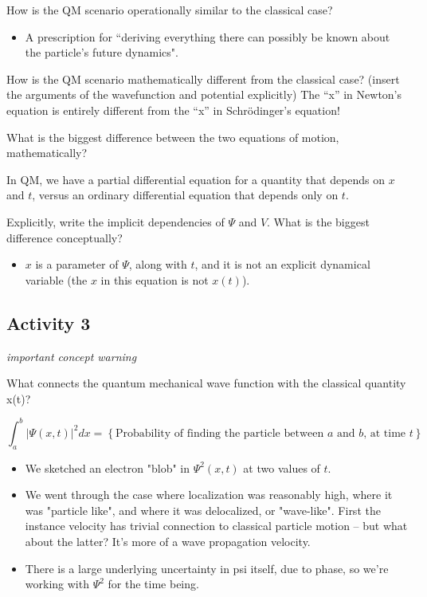 \documentclass{article}
\begin{document}
How is the QM scenario operationally similar to the classical case?

\begin{itemize}
    \item A prescription for “deriving everything there can possibly be known about the particle’s future dynamics".
\end{itemize}

How is the QM scenario mathematically different from the classical case? (insert the arguments of the wavefunction and potential explicitly)  The “x” in Newton’s equation is entirely different from the “x” in Schrödinger’s equation!

What is the biggest difference between the two equations of motion, mathematically?

In QM, we have a partial differential equation for a quantity that depends on $x$ and $t$, versus an ordinary differential equation that depends only on $t$. 

Explicitly, write the implicit dependencies of $\Psi$ and $V$. What is the biggest difference conceptually?

\begin{itemize}
    \item $x$ is a parameter of $\Psi$, along with $t$, and it is not an explicit dynamical variable (the $x$ in this equation is not $x(t)$). 
\end{itemize}

\subsection{Activity 3}

\textit{important concept warning}

What connects the quantum mechanical wave function with the classical quantity x(t)?

$$\int_a^b |\Psi(x,t)|^2 dx = \left\{ \text{Probability of finding the particle between } a \text{ and } b \text{, at time } t \right\}$$

\begin{itemize}
    \item We sketched an electron "blob" in $\Psi^2(x,t)$ at two values of $t$. 
    \item We went through the case where localization was reasonably high, where it was "particle like", and where it was delocalized, or "wave-like". First the instance velocity has trivial connection to classical particle motion -- but what about the latter? It's more of a wave propagation velocity. 
    \item There is a large underlying uncertainty in psi itself, due to phase, so we're working with $\Psi^2$ for the time being. 
\end{itemize}
\end{document}
